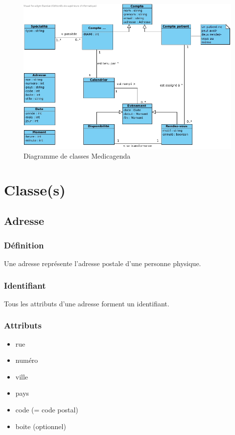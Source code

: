 \begin{figure}[hb]
    \centering
    \includegraphics[scale=0.4]{MCD/MCD.jpg}
    \caption{Diagramme de classes Medicagenda}
\end{figure}

\newpage
\section{Classe(s)}


\subsection{Adresse}

\subsubsection{Définition}

Une adresse représente l'adresse postale d'une personne physique.

\subsubsection{Identifiant}

Tous les attributs d'une adresse forment un identifiant.

\subsubsection{Attributs}

\begin{itemize}
    \item rue
    \item numéro
    \item ville
    \item pays
    \item code (= code postal)
    \item boite (optionnel)
\end{itemize}

